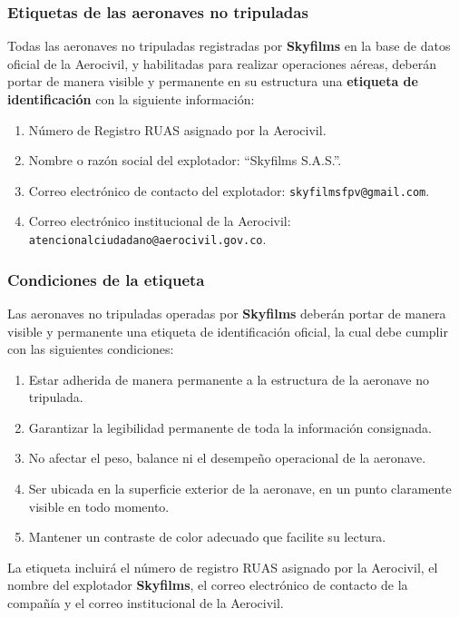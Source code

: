 \subsubsection{Etiquetas de las aeronaves no tripuladas}

Todas las aeronaves no tripuladas registradas por \textbf{Skyfilms} en la base de datos oficial de la Aerocivil, y habilitadas para realizar operaciones aéreas, deberán portar de manera visible y permanente en su estructura una \textbf{etiqueta de identificación} con la siguiente información:

\begin{enumerate}[label=\alph*)]
    \item Número de Registro RUAS asignado por la Aerocivil.
    \item Nombre o razón social del explotador: ``Skyfilms S.A.S.''.
    \item Correo electrónico de contacto del explotador: \texttt{skyfilmsfpv@gmail.com}.
    \item Correo electrónico institucional de la Aerocivil: \texttt{atencionalciudadano@aerocivil.gov.co}.
\end{enumerate}


\subsubsection{Condiciones de la etiqueta}

Las aeronaves no tripuladas operadas por \textbf{Skyfilms} deberán portar de manera visible y permanente una etiqueta de identificación oficial, la cual debe cumplir con las siguientes condiciones:

\begin{enumerate}[label=\alph*)]
    \item Estar adherida de manera permanente a la estructura de la aeronave no tripulada.
    \item Garantizar la legibilidad permanente de toda la información consignada.
    \item No afectar el peso, balance ni el desempeño operacional de la aeronave.
    \item Ser ubicada en la superficie exterior de la aeronave, en un punto claramente visible en todo momento.
    \item Mantener un contraste de color adecuado que facilite su lectura.
\end{enumerate}

La etiqueta incluirá el número de registro RUAS asignado por la Aerocivil, el nombre del explotador \textbf{Skyfilms}, el correo electrónico de contacto de la compañía y el correo institucional de la Aerocivil.

